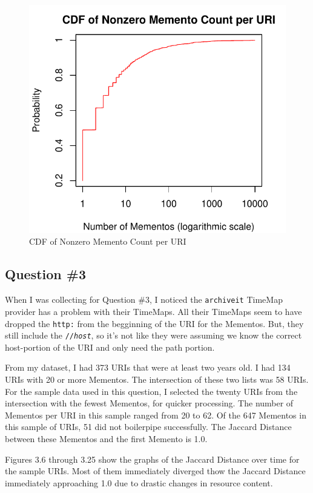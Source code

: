 \documentclass[a4paper,12pt]{article}
\begin{document}
\begin{figure}[H]
    \centering
    \includegraphics{stats/memento_counts_nonzero.pdf}
    \caption{CDF of Nonzero Memento Count per URI}
\end{figure}

\subsection{Question \#3}
When I was collecting for Question \#3, I noticed the \texttt{archiveit} TimeMap provider has a problem
with their TimeMaps. All their TimeMaps seem to have dropped the \texttt{http:} from the begginning of the
URI for the Mementos. But, they still include the \texttt{//\emph{host}}, so it's not like they were
assuming we know the correct host-portion of the URI and only need the path portion.

From my dataset, I had 373 URIs that were at least two years old. I had 134 URIs with 20 or more Mementos.
The intersection of these two lists was 58 URIs. For the sample data used in this question, I selected
the twenty URIs from the intersection with the fewest Mementos, for quicker processing. The number of
Mementos per URI in this sample ranged from 20 to 62. Of the 647 Mementos in this sample of URIs, 51
did not boilerpipe successfully. The Jaccard Distance between these Mementos and the first Memento is 1.0.

Figures 3.6 through 3.25 show the graphs of the Jaccard Distance over time for the sample URIs. Most of
them immediately diverged thow the Jaccard Distance immediately approaching 1.0 due to drastic changes in
resource content.
\end{document}
